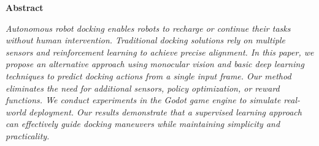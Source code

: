 \begin{center}
\textbf{Abstract}
\end{center}
\textit{Autonomous robot docking enables robots to recharge or continue their tasks without human intervention. Traditional docking solutions rely on multiple sensors and reinforcement learning to achieve precise alignment. In this paper, we propose an alternative approach using monocular vision and basic deep learning techniques to predict docking actions from a single input frame. Our method eliminates the need for additional sensors, policy optimization, or reward functions. We conduct experiments in the Godot game engine to simulate real-world deployment. Our results demonstrate that a supervised learning approach can effectively guide docking maneuvers while maintaining simplicity and practicality.}
